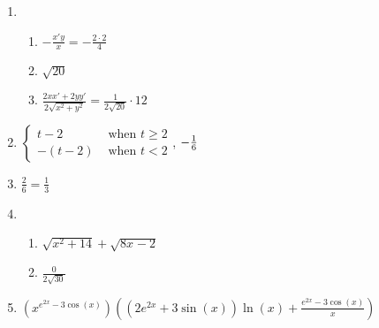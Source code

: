 \documentclass[12pt,twoside]{article}
\makeatletter
\def\emptycleardoublepage{\clearpage\if@twoside \ifodd\c@page\else
\thispagestyle{empty}%
\hbox{}\newpage\if@twocolumn\hbox{}\newpage\fi\fi\fi}
\makeatother
\begin{document}
\begin{multicols}{2}
\begin{enumerate}
\def \b{4}\def \x{4}\def \y{2}\def \xchange{2}\def \ratrhs{8}\def \cirrhs{32}\def \hyprhs{0}\def \compy{4y^{2}}\def \ychangenum{4}\def \dist{20}\def \fracrat{12}\def \fraccirc{12}\def \frachyp{20}
\item \begin{enumerate}
\item $-\frac{x'y}{x} = -\frac{\xchange \cdot \y}{\x}$
\item $\sqrt{\dist}$
\item $\frac{2xx'+2yy'}{2\sqrt{x^2+y^2}} = \frac{1}{2\sqrt{\dist}} \cdot \fracrat$
\end{enumerate}
\def \a{2}\def \k{6}\def \abstop{1}\def \ktop{0}
\item $\begin{cases} t-\a & \text{ when } t \geq \a \\ -(t- \a) & \text{ when } t < \a \end{cases}$, $\ifthenelse{\ktop=1}{-\k}{-\frac{1}{\k}}$
\def \a{3}\def \b{1}\def \k{6}\def \fancyp{x^{2}-4x^{}+3}\def \simplep{6x^{}-18}\def \fancyreduced{2}\def \niceanstop{\frac{1}{3}}\def \niceansbottom{3}
\item $\frac{\fancyreduced}{\k} = \niceanstop$
\def \a{4}\def \b{4}\def \ab{16}\def \c{14}\def \amb{0}\def \ansroot{30}\def \firstroot{x^{2}+14}\def \secondroot{8x^{}-2}\def \porm{-1}
\item \begin{enumerate}
\item $\sqrt{\firstroot} + \sqrt{\secondroot}$
\item $\frac{\amb}{2\sqrt{\ansroot}}$
\end{enumerate}
\def \varexp{2}\def \newexp{1}\def \trigcoeff{-3}\def \trigval{-3}\def \oppval{+3}
\item $(x^{e^{\varexp x} \trigval \cos(x)}) \left( (\varexp e^{\varexp x} \oppval \sin(x))\ln(x) + \frac{e^{\varexp x} \trigval \cos(x)}{x} \right)$
 \end{enumerate}\end{multicols}\emptycleardoublepage{}\graphicspath{{C:/Users/iainc/anaconda3/Randomizer/MATH 1001/Midterm 1/}}\begin{multicols}{2} \begin{enumerate}\def \a{-6}\def \b{9}\def \c{-7}\def \d{3}\def \negb{-9}\def \negc{7}\def \determ{45}\def \ansa{\frac{1}{15}}\def \ansb{\frac{-1}{5}}\def \ansc{\frac{7}{45}}\def \ansd{\frac{-2}{15}}

\end{enumerate}
\end{multicols}
\end{document}
